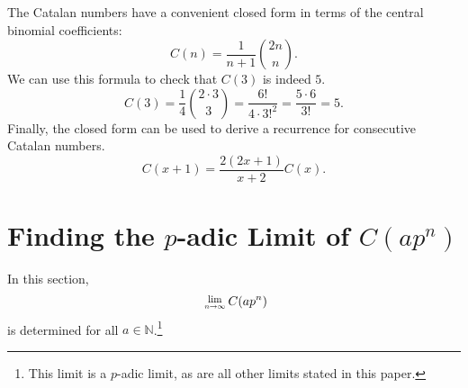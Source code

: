 \documentclass[12pt, letter]{article}    %
\theoremstyle{plain}
\theoremstyle{definition}
\numberwithin{equation}{section}
\newcommand{\Lim}[1]{\raisebox{0.5ex}{\scalebox{0.8}{$\displaystyle \lim_{#1}\;$}}}
\begin{document}
The Catalan numbers have a convenient closed form in terms of the central binomial coefficients:
$$C(n)=\frac{1}{n+1}\binom{2n}{n}.$$
We can use this formula to check that $C(3)$ is indeed $5$.
$$C(3)=\frac{1}{4}\binom{2\cdot3}{3}=\frac{6!}{4\cdot 3!^2}=\frac{5\cdot 6}{3!}=5.$$
Finally, the closed form can be used to derive a recurrence for consecutive Catalan numbers. $$C(x+1)=\frac{2(2x+1)}{x+2}C(x).$$





\section{Finding the $p$-adic Limit of $C(ap^n)$}

In this section, 
\begin{equation*}\label{limit eq}\
\Lim{n\rightarrow\infty}C(ap^n)
\end{equation*} is determined for all $a\in\mathbb{N}$.\footnote{This limit is a $p$-adic limit, as are all other limits stated in this paper.}
\end{document}
